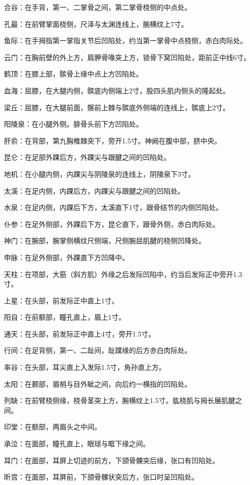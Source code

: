 \documentclass[12pt,UTF8]{ctexbook}
\begin{document}
合谷：在手背，第一、二掌骨之间，第二掌骨桡侧的中点处。

孔最：在前臂掌面桡侧，尺泽与太渊连线上，腕横纹上7寸。

鱼际：在手拇指第一掌指关节后凹陷处，约当第一掌骨中点桡侧，赤白肉际处。

云门：在胸前壁的外上方，肩胛骨喙突上方，锁骨下窝凹陷处，距前正中线6寸。

鹤顶：在膝上部，髌骨上缘中点上方凹陷处。

血海：屈膝，在大腿内侧，髌底内侧端上2寸，股四头肌内侧头的隆起处。

梁丘：屈膝，在大腿前面，髂前上棘与髌底外侧端的连线上，髌底上2寸。

阳陵泉：在小腿外侧。腓骨头前下方凹陷处。

肝俞：在背部，第九胸椎棘突下，旁开1.5寸。神阙在腹中部，脐中央。

昆仑：在足部外踝后方，外踝尖与跟腱之间的凹陷处。

地机：在小腿内侧，内踝尖与阴陵泉的连线上，阴陵泉下3寸。

太溪：在足内侧，内踝后方，内踝尖与跟腱之间的凹陷处。

水泉：在足内侧，内踝后下方，太溪直下1寸，跟骨结节的内侧凹陷处。

仆参：在足外侧部，外踝后下方，昆仑直下，跟骨外侧，赤白肉际处。

神门：在腕部，腕掌侧横纹尺侧端，尺侧腕屈肌腱的桡侧凹降处。

申脉：在足外侧部，外踝直下方凹降中。

天柱：在项部，大筋（斜方肌）外缘之后发际凹陷中，约当后发际正中旁开1.3寸。

上星：在头部，前发际正中直上1寸。

阳自：在前额部，瞳孔直上，眉上1寸。

通天：在头部，前发际正中直上4寸，旁开1.5寸。

行间：在足背侧，第一、二趾间，趾蹼缘的后方赤白肉际处。

率谷：在头部，耳尖直上入发际1.5寸，角孙直上方。

太阳：在颞部，眉梢与目外眦之间，向后约一横指的凹陷处。

列缺：在前臂桡侧缘，桡骨茎突上方，腕横纹上1.5寸。肱桡肌与拇长展肌腱之间。

印堂：在额部，两眉头之中间。

承泣：在面部，瞳孔直上，眼球与眶下缘之间。

耳门：在面部，耳屏上切迹的前方，下颌骨髁突后缘，张口有凹陷处。

昕宫：在面部，耳屏前，下颌骨髁状突后方，张口时呈凹陷处。
\end{document}
